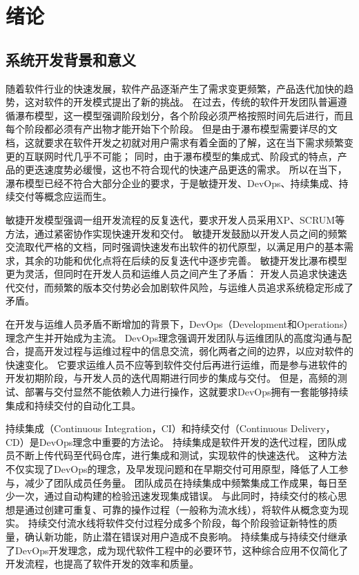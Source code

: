 
\chapter{绪论}

\section{系统开发背景和意义}
随着软件行业的快速发展，软件产品逐渐产生了需求变更频繁，产品迭代加快的趋势，这对软件的开发模式提出了新的挑战。
在过去，传统的软件开发团队普遍遵循瀑布模型，这一模型强调阶段划分，各个阶段必须严格按照时间先后进行，而且每个阶段都必须有产出物才能开始下个阶段\cite{瀑布模型}。
但是由于瀑布模型需要详尽的文档，这就要求在软件开发之初就对用户需求有着全面的了解，这在当下需求频繁变更的互联网时代几乎不可能；
同时，由于瀑布模型的集成式、阶段式的特点，产品的更迭速度势必缓慢，这也不符合现代的快速产品更迭的需求。
所以在当下，瀑布模型已经不符合大部分企业的要求，于是敏捷开发、DevOps、持续集成、持续交付等概念应运而生。

敏捷开发模型强调一组开发流程的反复迭代，要求开发人员采用XP、SCRUM等方法，通过紧密协作实现快速开发和交付。
敏捷开发鼓励以开发人员之间的频繁交流取代严格的文档，同时强调快速发布出软件的初代原型，以满足用户的基本需求，其余的功能和优化点将在后续的反复迭代中逐步完善\cite{敏捷开发}。
敏捷开发比瀑布模型更为灵活，但同时在开发人员和运维人员之间产生了矛盾：
开发人员追求快速迭代交付，而频繁的版本交付势必会加剧软件风险，与运维人员追求系统稳定形成了矛盾。

在开发与运维人员矛盾不断增加的背景下，DevOps（Development和Operations）理念产生并开始成为主流。
DevOps理念强调开发团队与运维团队的高度沟通与配合，提高开发过程与运维过程中的信息交流，弱化两者之间的边界，以应对软件的快速变化\cite{DevOps}。
它要求运维人员不应等到软件交付后再进行运维，而是参与进软件的开发初期阶段，与开发人员的迭代周期进行同步的集成与交付。
但是，高频的测试、部署与交付显然不能依赖人力进行操作，这就要求DevOps拥有一套能够持续集成和持续交付的自动化工具。

持续集成（Continuous Integration，CI）和持续交付（Continuous Delivery，CD）是DevOps理念中重要的方法论。
持续集成是软件开发的迭代过程，团队成员不断上传代码至代码仓库，进行集成和测试，实现软件的快速迭代\cite{绪论持续集成1}。
这种方法不仅实现了DevOps的理念，及早发现问题和在早期交付可用原型，降低了人工参与，减少了团队成员任务量。
团队成员在持续集成中频繁集成工作成果，每日至少一次，通过自动构建的检验迅速发现集成错误。
与此同时，持续交付的核心思想是通过创建可重复、可靠的操作过程（一般称为流水线），将软件从概念变为现实\cite{绪论持续集成2}。
持续交付流水线将软件交付过程分成多个阶段，每个阶段验证新特性的质量，确认新功能，防止潜在错误对用户造成不良影响。
持续集成与持续交付继承了DevOps开发理念，成为现代软件工程中的必要环节，这种综合应用不仅简化了开发流程，也提高了软件开发的效率和质量。


